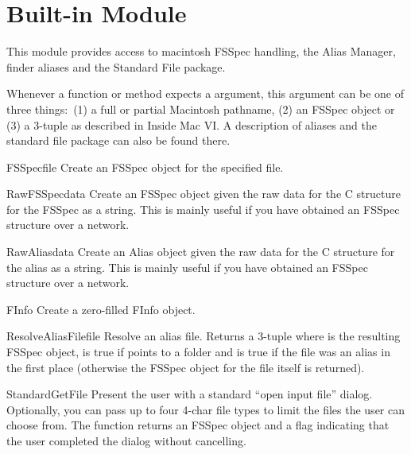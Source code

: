 \section{Built-in Module }

\renewcommand{\indexsubitem}{(in module macfs)}

This module provides access to macintosh FSSpec handling, the Alias
Manager, finder aliases and the Standard File package.

Whenever a function or method expects a  argument, this
argument can be one of three things:\ (1) a full or partial Macintosh
pathname, (2) an FSSpec object or (3) a 3-tuple  as described in Inside Mac VI\@. A description of aliases
and the standard file package can also be found there.

\begin{funcdesc}{FSSpec}{file}
Create an FSSpec object for the specified file.
\end{funcdesc}

\begin{funcdesc}{RawFSSpec}{data}
Create an FSSpec object given the raw data for the C structure for the
FSSpec as a string.  This is mainly useful if you have obtained an
FSSpec structure over a network.
\end{funcdesc}

\begin{funcdesc}{RawAlias}{data}
Create an Alias object given the raw data for the C structure for the
alias as a string.  This is mainly useful if you have obtained an
FSSpec structure over a network.
\end{funcdesc}

\begin{funcdesc}{FInfo}{}
Create a zero-filled FInfo object.
\end{funcdesc}

\begin{funcdesc}{ResolveAliasFile}{file}
Resolve an alias file. Returns a 3-tuple  where  is the resulting FSSpec object,
 is true if  points to a folder and
 is true if the file was an alias in the first place
(otherwise the FSSpec object for the file itself is returned).
\end{funcdesc}

\begin{funcdesc}{StandardGetFile}{}
Present the user with a standard ``open input file''
dialog. Optionally, you can pass up to four 4-char file types to limit
the files the user can choose from. The function returns an FSSpec
object and a flag indicating that the user completed the dialog
without cancelling.
\end{funcdesc}


